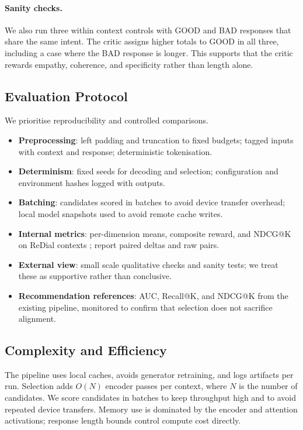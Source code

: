 \documentclass[12pt]{article}
\begin{document}
  \paragraph{Sanity checks.} We also run three within context controls with GOOD and BAD responses that share the same intent. The critic assigns higher totals to GOOD in all three, including a case where the BAD response is longer. This supports that the critic rewards empathy, coherence, and specificity rather than length alone.
  
  \subsection{Evaluation Protocol}
  We prioritise reproducibility and controlled comparisons.
  \begin{itemize}[leftmargin=*]
    \item \textbf{Preprocessing}: left padding and truncation to fixed budgets; tagged inputs with context and response; deterministic tokenisation.
    \item \textbf{Determinism}: fixed seeds for decoding and selection; configuration and environment hashes logged with outputs.
    \item \textbf{Batching}: candidates scored in batches to avoid device transfer overhead; local model snapshots used to avoid remote cache writes.
    \item \textbf{Internal metrics}: per-dimension means, composite reward, and NDCG@K \citep{evidently_ndcg} on ReDial contexts \citep{charlin2018redial}; report paired deltas and raw pairs.
    \item \textbf{External view}: small scale qualitative checks and sanity tests; we treat these as supportive rather than conclusive.
    \item \textbf{Recommendation references}: AUC, Recall@K, and NDCG@K from the existing pipeline, monitored to confirm that selection does not sacrifice alignment.
  \end{itemize}
  
  \subsection{Complexity and Efficiency}
  The pipeline uses local caches, avoids generator retraining, and logs artifacts per run. Selection adds $O(N)$ encoder passes per context, where $N$ is the number of candidates. We score candidates in batches to keep throughput high and to avoid repeated device transfers. Memory use is dominated by the encoder and attention activations; response length bounds control compute cost directly.
  
\end{document}
